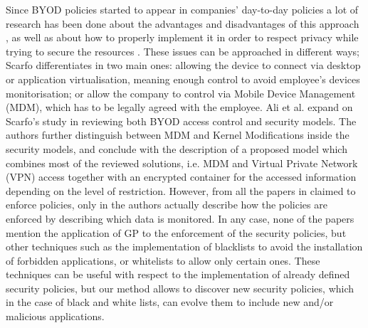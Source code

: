 \documentclass[a4paper,10pt,twocolumn,preprint,3p]{elsarticle}
\begin{document}
Since BYOD policies started to appear in companies' day-to-day policies  a lot
of research has been done about the advantages and disadvantages of
this approach \cite{singh2012byod}, as well as about how to properly implement it in order to
respect privacy while trying to secure the resources \cite{scarfo2012new, ali2015analysis, de2015corporate}.
These issues can be approached in different ways; Scarfo
differentiates in \cite{scarfo2012new} two main ones: allowing the
device to connect via desktop or application virtualisation, meaning
enough control to avoid employee's devices monitorisation; or allow
the company to control
via Mobile Device Management (MDM), which has to be legally agreed
with the employee. %
 Ali et al. expand on Scarfo's study in
\cite{ali2015analysis}  reviewing both BYOD access control
 and security models. The authors further distinguish
between MDM and Kernel Modifications inside the security models, and
conclude with the description of a proposed model which combines most
of the reviewed solutions, i.e. MDM and Virtual Private Network (VPN)
access together with an encrypted container for the accessed
information depending on the level of restriction. However, from all
the papers in \cite{ali2015analysis} claimed to enforce policies, only
in \cite{rhee2013high} the authors actually describe how the policies
are enforced by describing which data is monitored. In any case, none
of the papers mention the application of GP to the enforcement of the
security policies, but other techniques such as the implementation of
blacklists to avoid the installation of forbidden applications, or
whitelists to allow only certain ones. These techniques can be useful
with respect to the implementation of already defined security
policies, but our method allows to discover new security policies,
which in the case of black and white lists, can evolve them to include
new and/or malicious applications. 
\end{document}
